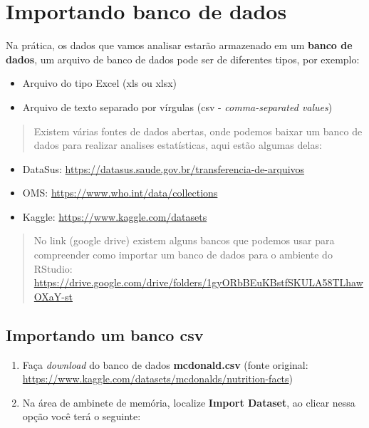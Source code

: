 \documentclass[
]{book}
\begin{document}
\chapter{Importando banco de dados}\label{importando-banco-de-dados}

Na prática, os dados que vamos analisar estarão armazenado em um \textbf{banco de dados}, um arquivo de banco de dados pode ser de diferentes tipos, por exemplo:

\begin{itemize}
\item
  Arquivo do tipo Excel (xls ou xlsx)
\item
  Arquivo de texto separado por vírgulas (csv - \emph{comma-separated values})
\end{itemize}

\begin{quote}
Existem várias fontes de dados abertas, onde podemos baixar um banco de dados para realizar analises estatísticas, aqui estão algumas delas:
\end{quote}

\begin{itemize}
\item
  DataSus: \url{https://datasus.saude.gov.br/transferencia-de-arquivos}
\item
  OMS: \url{https://www.who.int/data/collections}
\item
  Kaggle: \url{https://www.kaggle.com/datasets}
\end{itemize}

\begin{quote}
No link (google drive) existem alguns bancos que podemos usar para compreender como importar um banco de dados para o ambiente do RStudio: \url{https://drive.google.com/drive/folders/1gyORbBEuKBstfSKULA58TLhawOXaY-st}
\end{quote}

\section{Importando um banco csv}\label{importando-um-banco-csv}

\begin{enumerate}
\def\labelenumi{\arabic{enumi}.}
\item
  Faça \emph{download} do banco de dados \textbf{mcdonald.csv}
  (fonte original: \url{https://www.kaggle.com/datasets/mcdonalds/nutrition-facts})
\item
  Na área de ambinete de memória, localize \textbf{Import Dataset}, ao clicar nessa opção você terá o seguinte:
\end{enumerate}
\end{document}
